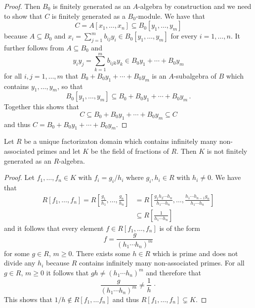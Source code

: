 \begin{proof}
  Then $B_0$ is finitely generated as an $A$-algebra by construction and we need to show that $C$ is finitely generated as a $B_0$-module.
  We have that
  \[
              C
    =         A[x_1, \dotsc, x_n]
    \subseteq B_0[y_1, \dotsc, y_m]
  \]
  because $A \subseteq B_0$ and $x_i = \sum_{j=1}^m b_{ij} y_i \in B_0[y_1, \dotsc, y_m]$ for every $i = 1, \dotsc, n$.
  It further follows from $A \subseteq B_0$ and
  \[
        y_i y_j
    =   \sum_{k=1}^m b_{ijk} y_k
    \in B_0 y_1 + \dotsb + B_0 y_m
  \]
  for all $i, j = 1, \dotsc, m$ that $B_0 + B_0 y_1 + \dotsb + B_0 y_m$ is an $A$-subalgebra of $B$ which contains $y_1, \dotsc, y_m$, so that
  \[
              B_0[y_1, \dotsc, y_m]
    \subseteq B_0 + B_0 y_1 + \dotsb + B_0 y_m \,.
  \]
  Together this shows that
  \[
              C
    \subseteq B_0 + B_0 y_1 + \dotsb + B_0 y_m
    \subseteq C
  \]
  and thus $C = B_0 + B_0 y_1 + \dotsb + B_0 y_m$.
\end{proof}


\begin{lemma}
  \label{lemma: field of fractions not finitely generated}
  Let $R$ be a unique factorizaton domain which contains infinitely many non-associated primes and let $K$ be the field of fractions of $R$.
  Then $K$ is not finitely generated as an $R$-algebra.
\end{lemma}


\begin{proof}
  Let $f_1, \dotsc, f_n \in K$ with $f_i = g_i/h_i$ where $g_i, h_i \in R$ with $h_i \neq 0$.
  We have that
  \begin{align*}
                R[f_1, \dotsc, f_n]
     =          R\left[ \frac{g_1}{h_1}, \dotsc, \frac{g_n}{h_n} \right]
    &=          R\left[
                  \frac{g_1 h_2 \dotsm h_n}{h_1 \dotsm h_n},
                  \dotsc,
                  \frac{h_1 \dotsm h_{n-1} g_n}{h_1 \dotsm h_n}
                \right] \\
    &\subseteq  R\left[ \frac{1}{h_1 \dotsm h_n} \right]
  \end{align*}
  and it follows that every element $f \in R[f_1, \dotsc, f_n]$ is of the form
  \[
      f
    = \frac{g}{(h_1 \dotsm h_n)^m}
  \]
  for some $g \in R$, $m \geq 0$.
  There exists some $h \in R$ which is prime and does not divide any $h_i$ because $R$ contains infinitely many non-associated primes.
  For all $g \in R$, $m \geq 0$ it follows that $gh \neq (h_1 \dotsm h_n)^m$ and therefore that
  \[
    \frac{g}{(h_1 \dotsm h_n)^m} \neq \frac{1}{h} \,\cdotp
  \]
  This shows that $1/h \notin R[f_1, \dotsc f_n]$ and thus $R[f_1, \dotsc, f_n] \subsetneq K$.
\end{proof}


